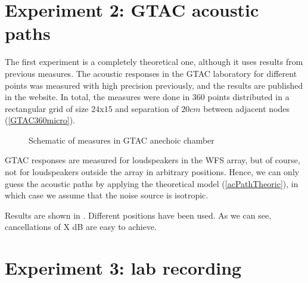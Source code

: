 \section{Experiment 2: GTAC acoustic paths}
The first experiment is a completely theoretical one, although it uses results from previous measures. The acoustic responses in the GTAC laboratory for different points was measured with high precision previously, and the results are published in the website. In total, the measures were done in 360 points distributed in a rectangular grid of size $24$x$15$ and separation of $20 \si{cm}$ between adjacent nodes (\autoref{GTAC360micro}).

\begin{figure}
	\centering
	\caption[Schematic of measures in GTAC anechoic chamber]{Schematic of measures in GTAC anechoic chamber}
	\label{GTAC360micro}
\end{figure}


GTAC responses are measured for loudspeakers in the WFS array, but of course, not for loudspeakers outside the array in arbitrary positions. Hence, we can only guess the acoustic paths by applying the theoretical model (\autoref{acPathTheoric}), in which case we assume that the noise source is isotropic.

Results are shown in . Different positions have been used. As we can see, cancellations of X dB are easy to achieve.



\section{Experiment 3: lab recording}
